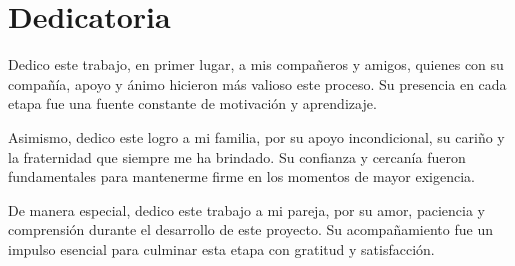 \section{Dedicatoria}

Dedico este trabajo, en primer lugar, a mis compañeros y amigos, quienes con su compañía, apoyo y ánimo hicieron más valioso este proceso. Su presencia en cada etapa fue una fuente constante de motivación y aprendizaje.

Asimismo, dedico este logro a mi familia, por su apoyo incondicional, su cariño y la fraternidad que siempre me ha brindado. Su confianza y cercanía fueron fundamentales para mantenerme firme en los momentos de mayor exigencia.

De manera especial, dedico este trabajo a mi pareja, por su amor, paciencia y comprensión durante el desarrollo de este proyecto. Su acompañamiento fue un impulso esencial para culminar esta etapa con gratitud y satisfacción.